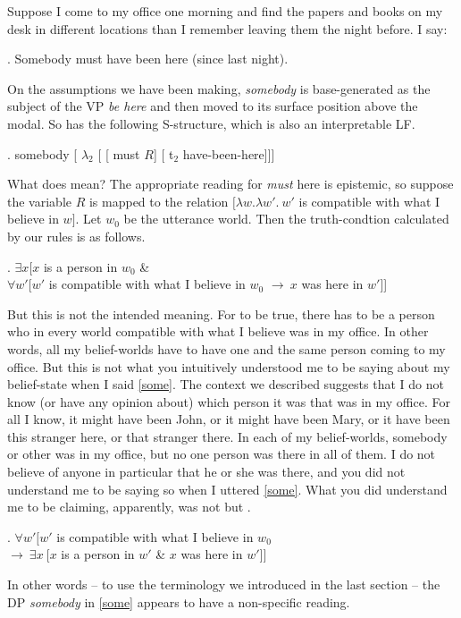Suppose I come to my office one morning and find the papers and books on my desk in different locations than I remember leaving them the night before. I say:

\ex. \label{some} Somebody must have been here (since last night).

On the assumptions we have been making, \emph{somebody} is base-generated as the subject of the VP \emph{be here} and then moved to its surface position above the modal. So \Last has the following S-structure, which is also an interpretable LF.

\exi. \label{dere} somebody [ $\lambda_2$ [ [ must $R$] [ t$_2$ have-been-here]]]

What does \Last mean? The appropriate reading for \emph{must} here is epistemic, so suppose the variable $R$ is mapped to the relation $\bigl[\lambda w.\lambda w'.\ w'$ is compatible with what I believe in $w\bigr]$. Let $w_{0}$ be the utterance world. Then the truth-condtion calculated by our rules is as follows.

\ex. $\exists x [x$ is a person in $w_{0}$ \& \\
$\forall w'[w'$ is compatible with what I believe in $w_{0}$ $\rightarrow\ x$ was here in $w'$]]

But this is not the intended meaning. For \Last to be true, there has to be a person who in every world compatible with what I believe was in my office. In other words, all my belief-worlds have to have one and the same person coming to my office. But this is not what you intuitively understood me to be saying about my belief-state when I said \ref{some}. The context we described suggests that I do not know (or have any opinion about) which person it was that was in my office. For all I know, it might have been John, or it might have been Mary, or it have been this stranger here, or that stranger there. In each of my belief-worlds, somebody or other was in my office, but no one person was there in all of them. I do not believe of anyone in particular that he or she was there, and you did not understand me to be saying so when I uttered \ref{some}. What you did understand me to be claiming, apparently, was not \Last but \Next.

\ex. \label{dedic} $\forall w' [ w'$ is compatible with what I believe in $w_{0}$\\
\null\hfill$\rightarrow\ \exists x\ [x$ is a person in $w'$ \& $x$ was here in $w']]$

In other words -- to use the terminology we introduced in the last section -- the DP \emph{somebody} in \ref{some} appears to have a non-specific reading.

